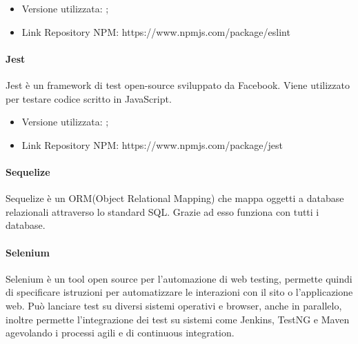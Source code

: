\documentclass[../manuale_sviluppatore.tex]{subfiles}
\begin{document}
\begin{itemize}
    \item Versione utilizzata: ;
    \item Link Repository NPM: https://www.npmjs.com/package/eslint 
\end{itemize}

\paragraph{Jest}
Jest è un framework di test open-source sviluppato da Facebook. Viene utilizzato per testare codice scritto in JavaScript. 
\begin{itemize}
    \item Versione utilizzata: ;
    \item Link Repository NPM: https://www.npmjs.com/package/jest 
\end{itemize}

\paragraph{Sequelize}
Sequelize è un ORM(Object Relational Mapping) che mappa oggetti a database relazionali attraverso lo standard SQL. Grazie ad esso funziona con tutti i database.

\paragraph{Selenium}
Selenium è un tool open source per l'automazione di web testing, permette quindi di specificare istruzioni per automatizzare le interazioni con il sito o l’applicazione web. 
Può lanciare test su diversi sistemi operativi e browser, anche in parallelo, inoltre permette l’integrazione dei test su sistemi come Jenkins, TestNG e Maven agevolando i processi agili e di continuous integration.
\end{document}
